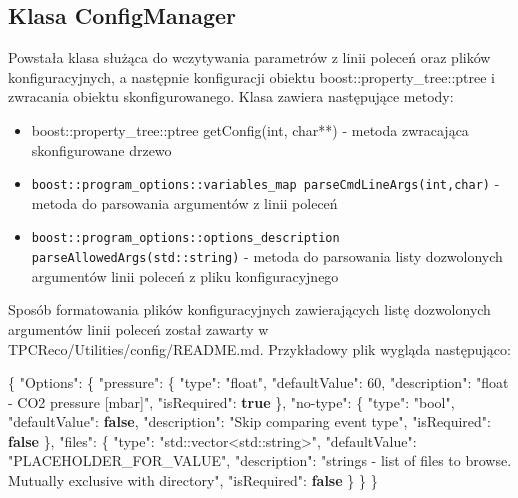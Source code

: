 \documentclass{article}
\newenvironment{Shaded}{}{}
\newcommand{\DataTypeTok}[1]{\textcolor[rgb]{0.56,0.13,0.00}{#1}}
\newcommand{\DecValTok}[1]{\textcolor[rgb]{0.25,0.63,0.44}{#1}}
\newcommand{\FunctionTok}[1]{\textcolor[rgb]{0.02,0.16,0.49}{#1}}
\newcommand{\KeywordTok}[1]{\textcolor[rgb]{0.00,0.44,0.13}{\textbf{#1}}}
\newcommand{\StringTok}[1]{\textcolor[rgb]{0.25,0.44,0.63}{#1}}
\begin{document}
\subsection{Klasa ConfigManager}
Powstała klasa służąca do wczytywania parametrów z linii poleceń oraz plików konfiguracyjnych, a następnie konfiguracji obiektu boost::property\_tree::ptree i zwracania obiektu skonfigurowanego. Klasa zawiera następujące metody:
\begin{itemize}
    \item boost::property\_tree::ptree getConfig(int, char**) - metoda zwracająca skonfigurowane drzewo
    \item \texttt{boost::program\_options::variables\_map parseCmdLineArgs(int,char)} - metoda do parsowania argumentów z linii poleceń
    \item \texttt{boost::program\_options::options\_description parseAllowedArgs(std::string)} - metoda do parsowania listy dozwolonych argumentów linii poleceń z pliku konfiguracyjnego
\end{itemize}
Sposób formatowania plików konfiguracyjnych zawierających listę dozwolonych argumentów linii poleceń został zawarty w TPCReco/Utilities/config/README.md. Przykładowy plik wygląda następująco:

\begin{Shaded}
\begin{Highlighting}[]
\FunctionTok{\{}   \DataTypeTok{"Options"}\FunctionTok{:}
    \FunctionTok{\{}
        \DataTypeTok{"pressure"}\FunctionTok{:} \FunctionTok{\{}
            \DataTypeTok{"type"}\FunctionTok{:} \StringTok{"float"}\FunctionTok{,}
            \DataTypeTok{"defaultValue"}\FunctionTok{:} \DecValTok{60}\FunctionTok{,}
            \DataTypeTok{"description"}\FunctionTok{:} \StringTok{"float {-} CO2 pressure [mbar]"}\FunctionTok{,}
            \DataTypeTok{"isRequired"}\FunctionTok{:} \KeywordTok{true}
        \FunctionTok{\},}
        \DataTypeTok{"no{-}type"}\FunctionTok{:} \FunctionTok{\{}
            \DataTypeTok{"type"}\FunctionTok{:} \StringTok{"bool"}\FunctionTok{,}
            \DataTypeTok{"defaultValue"}\FunctionTok{:} \KeywordTok{false}\FunctionTok{,}
            \DataTypeTok{"description"}\FunctionTok{:} \StringTok{"Skip comparing event type"}\FunctionTok{,}
            \DataTypeTok{"isRequired"}\FunctionTok{:} \KeywordTok{false}
        \FunctionTok{\},}
        \DataTypeTok{"files"}\FunctionTok{:} \FunctionTok{\{}
            \DataTypeTok{"type"}\FunctionTok{:} \StringTok{"std::vector\textless{}std::string\textgreater{}"}\FunctionTok{,}
            \DataTypeTok{"defaultValue"}\FunctionTok{:} \StringTok{"PLACEHOLDER\_FOR\_VALUE"}\FunctionTok{,}
            \DataTypeTok{"description"}\FunctionTok{:} \StringTok{"strings {-} list of files to browse. Mutually exclusive with \textquotesingle{}directory\textquotesingle{}"}\FunctionTok{,}
            \DataTypeTok{"isRequired"}\FunctionTok{:} \KeywordTok{false}
        \FunctionTok{\}}
    \FunctionTok{\}}
\FunctionTok{\}}
\end{Highlighting}
\end{Shaded}
\end{document}
